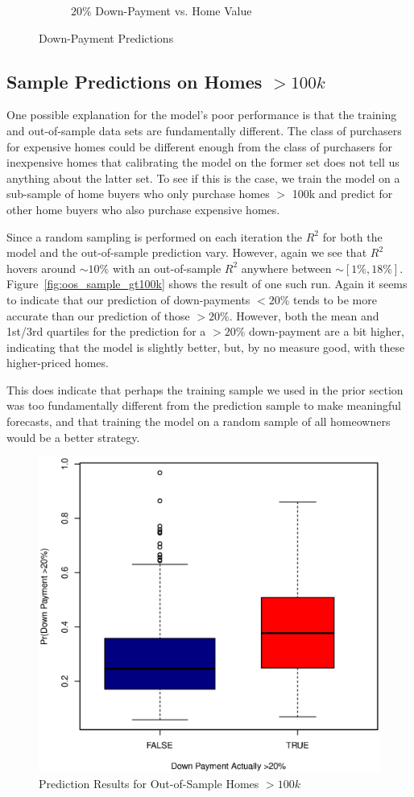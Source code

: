 \documentclass[11pt, fleqn]{article}
\begin{document}
\begin{figure}
\begin{subfigure}[b]{0.49\textwidth}
    \caption{$20\%$ Down-Payment vs. Home Value}
    \label{fig:value_20dwn}
  \end{subfigure}
  \caption{Down-Payment Predictions}
\end{figure}

\subsection{Sample Predictions on Homes $>100k$}

One possible explanation for the model's poor performance is that the training and out-of-sample data sets are fundamentally different. The class of purchasers for expensive homes could be different enough from the class of purchasers for inexpensive homes that calibrating the model on the former set does not tell us anything about the latter set. To see if this is the case, we train the model on a sub-sample of home buyers who only purchase homes $>$ 100k and predict for other home buyers who also purchase expensive homes.

Since a random sampling is performed on each iteration the $R^2$ for both the model and the out-of-sample prediction vary.  However, again we see that $R^2$ hovers around $\sim10\%$ with an out-of-sample $R^2$ anywhere between $\sim[1\%,18\%]$.  Figure~\vref{fig:oos_sample_gt100k} shows the result of one such run.  Again it seems to indicate that our prediction of down-payments $<20\%$ tends to be more accurate than our prediction of those $>20\%$.  However, both the mean and 1st/3rd quartiles for the prediction for a $>20\%$ down-payment are a bit higher, indicating that the model is slightly better, but, by no measure good, with these higher-priced homes.

This does indicate that perhaps the training sample we used in the prior section was too fundamentally different from the prediction sample to make meaningful forecasts, and that training the model on a random sample of all homeowners would be a better strategy.

\begin{figure}[!htb]
  \centering
  \includegraphics[scale=.5]{oos_subsample_100k.eps}
  \caption{Prediction Results for Out-of-Sample Homes $>100k$}
  \label{fig:oos_sample_gt100k}
\end{figure}
\end{document}
